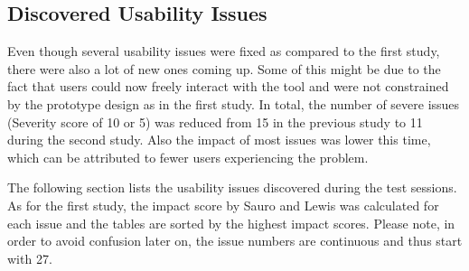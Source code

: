 

\subsection{Discovered Usability Issues} \label{sec:discovered-usability-issues}
Even though several usability issues were fixed as compared to the first study, there were also a lot of new ones coming up. Some of this might be due to the fact that users could now freely interact with the tool and were not constrained by the prototype design as in the first study. In total, the number of  severe issues (Severity score of 10 or 5) was reduced from 15 in the previous study to 11 during the second study. Also the impact of most issues was lower this time, which can be attributed to fewer users experiencing the problem.

The following section lists the usability issues discovered during the test sessions. As for the first study, the impact score by Sauro and Lewis \cite{sauro_quantifying_2012} was calculated for each issue and the tables are sorted by the highest impact scores. Please note, in order to avoid confusion later on, the issue numbers are continuous and thus start with 27.



